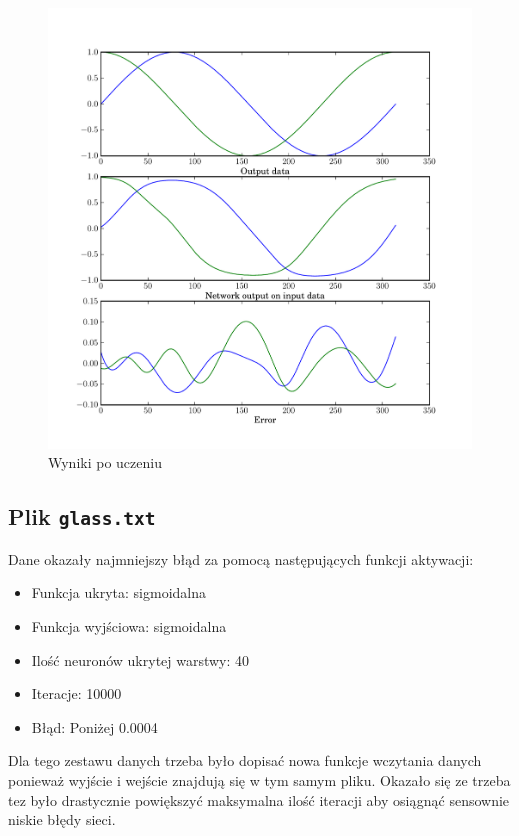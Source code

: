 \documentclass[pointlessnumbers, abstracton, headsepline, a4paper]{scrartcl}
\begin{document}
\clearpage
\begin{figure}[!h]
\centering
\includegraphics[scale=0.7]{src/sincos.pdf}\caption{\label{fig:xor_result}Wyniki po uczeniu}
\end{figure}

\clearpage
\subsection{Plik \texttt{glass.txt}}

Dane okazały najmniejszy błąd za pomocą następujących funkcji aktywacji:
\begin{itemize}
\item Funkcja ukryta: sigmoidalna
\item Funkcja wyjściowa: sigmoidalna
\item Ilość neuronów ukrytej warstwy: 40
\item Iteracje: 10000
\item Błąd: Poniżej 0.0004
\end{itemize}

Dla tego zestawu danych trzeba było dopisać nowa funkcje wczytania danych ponieważ wyjście i wejście znajdują się w tym samym pliku. Okazało się ze trzeba tez było drastycznie powiększyć maksymalna ilość iteracji aby osiągnąć sensownie niskie błędy sieci.
\end{document}

